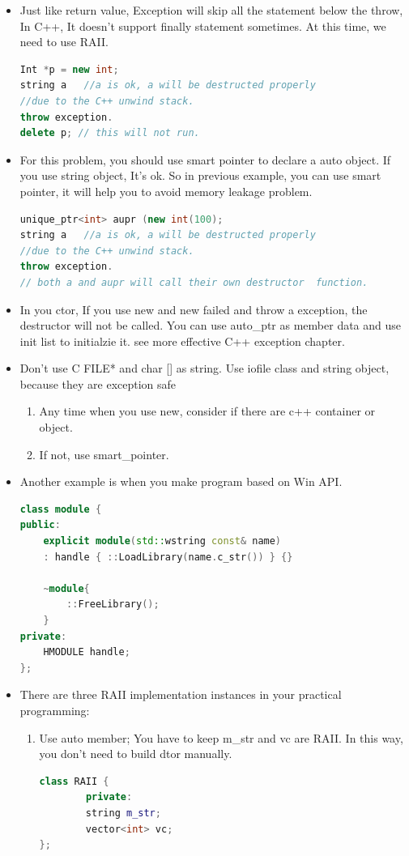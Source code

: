 \documentclass[a4paper,11pt,twoside]{book}
\begin{document}
\begin{itemize}
	\item Just like return value,  Exception will skip all the statement below the throw, In C++, It doesn't support finally statement sometimes. At this time, we need to use RAII.
\begin{lstlisting}[frame=single, language=c++]
Int *p = new int;
string a   //a is ok, a will be destructed properly
//due to the C++ unwind stack.
throw exception.
delete p; // this will not run.
\end{lstlisting}
	
	\item For this problem, you should use smart pointer to declare a auto object.  If you use string object, It's ok.  So in previous example,  you can use smart pointer, it will help you to avoid memory leakage problem.
\begin{lstlisting}[frame=single, language=c++]
unique_ptr<int> aupr (new int(100);
string a   //a is ok, a will be destructed properly
//due to the C++ unwind stack.
throw exception.
// both a and aupr will call their own destructor  function.
\end{lstlisting}
	
	\item In you ctor, If you use new and new failed and throw a exception, the destructor will not be called. You can use auto\_ptr as member data and use init list to initialzie it. see  more effective C++ exception chapter.
	
	\item Don't use C FILE* and char [] as string. Use iofile class and string object, because they are exception safe
	\begin{enumerate}
		\item Any time when you use new, consider if there are c++ container or object.
		\item If not, use smart\_pointer.
	\end{enumerate}
	
	\item Another example is when you make program based on Win API.
\begin{lstlisting}[frame=single, language=c++]
class module {
public:
	explicit module(std::wstring const& name)
	: handle { ::LoadLibrary(name.c_str()) } {}
	
	~module{
		::FreeLibrary();
	}
private:
	HMODULE handle;
};
\end{lstlisting}
	
	\item There are three RAII implementation instances in your practical programming:
	\begin{enumerate}
		\item Use auto member; You have to keep m\_str and vc are RAII.  In this way, you don't need to build dtor manually.
\begin{lstlisting}[frame=single, language=c++]
class RAII {
		private:
		string m_str;
		vector<int> vc;
};
\end{lstlisting}
		

\end{enumerate}
\end{itemize}
\end{document}
